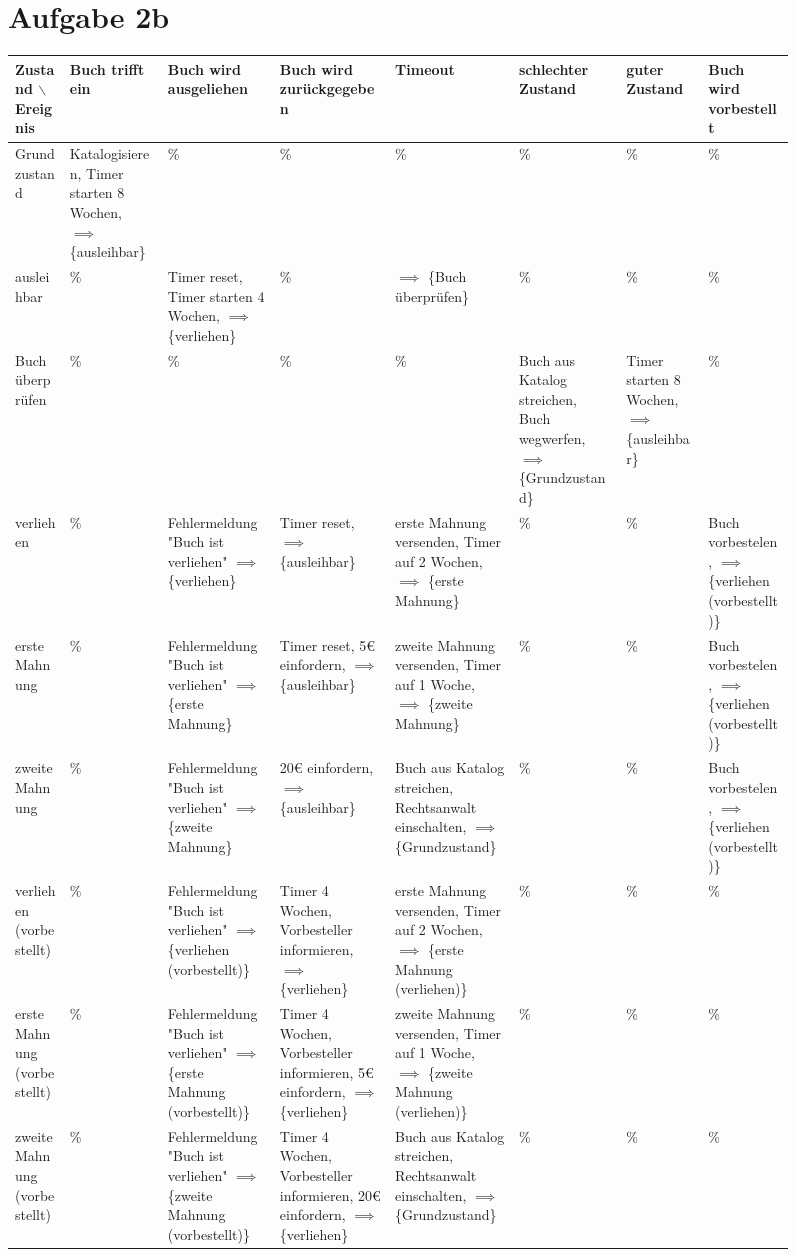 \documentclass[koma,a4paper,10pt]{scrartcl}
\begin{document}
\begin{sidewaysfigure}
\section{Aufgabe 2b}
\label{sec-3}
\begin{adjustbox}{width=\textwidth}
\begin{tabular}{|p{3cm}|p{3cm}|p{3cm}|p{3cm}|p{3cm}|p{3cm}|p{3cm}|p{3cm}|}
Zustand $\backslash$ Ereignis & Buch trifft ein & Buch wird ausgeliehen & Buch wird zurückgegeben & Timeout & schlechter Zustand & guter Zustand & Buch wird vorbestellt\\
\hline
Grundzustand & Katalogisieren, Timer starten 8 Wochen, $\implies$ \{ausleihbar\} & \% & \% & \% & \% & \% & \%\\
ausleihbar & \% & Timer reset, Timer starten 4 Wochen, $\implies$ \{verliehen\} & \% & $\implies$ \{Buch überprüfen\} & \% & \% & \%\\
Buch überprüfen & \% & \% & \% & \% & Buch aus Katalog streichen, Buch wegwerfen, $\implies$ \{Grundzustand\} & Timer starten 8 Wochen, $\implies$ \{ausleihbar\} & \%\\
verliehen & \% & Fehlermeldung "Buch ist verliehen" $\implies$ \{verliehen\} & Timer reset, $\implies$ \{ausleihbar\} & erste Mahnung versenden, Timer auf 2 Wochen, $\implies$ \{erste Mahnung\} & \% & \% & Buch vorbestelen, $\implies$ \{verliehen (vorbestellt)\}\\
erste Mahnung & \% & Fehlermeldung "Buch ist verliehen" $\implies$ \{erste Mahnung\} & Timer reset, 5€ einfordern, $\implies$ \{ausleihbar\} & zweite Mahnung versenden, Timer auf 1 Woche, $\implies$ \{zweite Mahnung\} & \% & \% & Buch vorbestelen, $\implies$ \{verliehen (vorbestellt)\}\\
zweite Mahnung & \% & Fehlermeldung "Buch ist verliehen" $\implies$ \{zweite Mahnung\} & 20€ einfordern, $\implies$ \{ausleihbar\} & Buch aus Katalog streichen, Rechtsanwalt einschalten, $\implies$ \{Grundzustand\} & \% & \% & Buch vorbestelen, $\implies$ \{verliehen (vorbestellt)\}\\
verliehen (vorbestellt) & \% & Fehlermeldung "Buch ist verliehen" $\implies$ \{verliehen (vorbestellt)\} & Timer 4 Wochen, Vorbesteller informieren, $\implies$ \{verliehen\} & erste Mahnung versenden, Timer auf 2 Wochen, $\implies$ \{erste Mahnung (verliehen)\} & \% & \% & \%\\
erste Mahnung (vorbestellt) & \% & Fehlermeldung "Buch ist verliehen" $\implies$ \{erste Mahnung (vorbestellt)\} & Timer 4 Wochen, Vorbesteller informieren, 5€ einfordern, $\implies$ \{verliehen\} & zweite Mahnung versenden, Timer auf 1 Woche, $\implies$ \{zweite Mahnung (verliehen)\} & \% & \% & \%\\
zweite Mahnung (vorbestellt) & \% & Fehlermeldung "Buch ist verliehen" $\implies$ \{zweite Mahnung (vorbestellt)\} & Timer 4 Wochen, Vorbesteller informieren, 20€ einfordern, $\implies$ \{verliehen\} & Buch aus Katalog streichen, Rechtsanwalt einschalten, $\implies$ \{Grundzustand\} & \% & \% & \%\\
\end{tabular}
\end{adjustbox}
\end{sidewaysfigure}
\pagebreak
\end{document}
